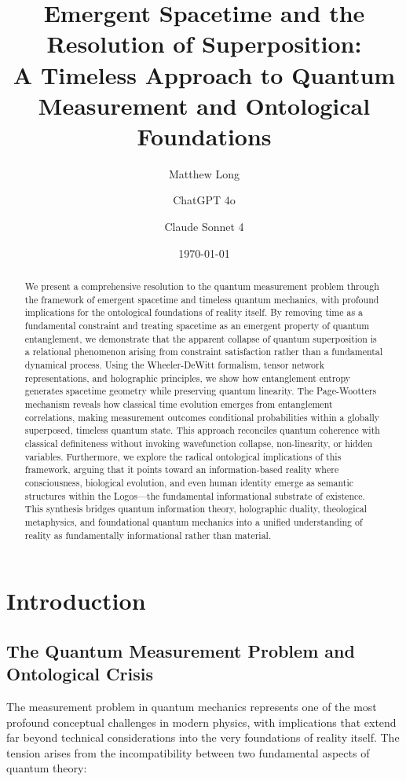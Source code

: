 \documentclass[12pt,a4paper]{article}
\title{Emergent Spacetime and the Resolution of Superposition: \\ A Timeless Approach to Quantum Measurement and Ontological Foundations}
\author[1]{Matthew Long}
\author[2]{ChatGPT 4o}
\author[3]{Claude Sonnet 4}
\affil[1]{Yoneda AI}
\affil[2]{OpenAI}
\affil[3]{Anthropic}
\date{\today}
\begin{document}
\maketitle

\begin{abstract}
We present a comprehensive resolution to the quantum measurement problem through the framework of emergent spacetime and timeless quantum mechanics, with profound implications for the ontological foundations of reality itself. By removing time as a fundamental constraint and treating spacetime as an emergent property of quantum entanglement, we demonstrate that the apparent collapse of quantum superposition is a relational phenomenon arising from constraint satisfaction rather than a fundamental dynamical process. Using the Wheeler-DeWitt formalism, tensor network representations, and holographic principles, we show how entanglement entropy generates spacetime geometry while preserving quantum linearity. The Page-Wootters mechanism reveals how classical time evolution emerges from entanglement correlations, making measurement outcomes conditional probabilities within a globally superposed, timeless quantum state. This approach reconciles quantum coherence with classical definiteness without invoking wavefunction collapse, non-linearity, or hidden variables. Furthermore, we explore the radical ontological implications of this framework, arguing that it points toward an information-based reality where consciousness, biological evolution, and even human identity emerge as semantic structures within the Logos—the fundamental informational substrate of existence. This synthesis bridges quantum information theory, holographic duality, theological metaphysics, and foundational quantum mechanics into a unified understanding of reality as fundamentally informational rather than material.
\end{abstract}

\onehalfspacing
\tableofcontents
\newpage

\section{Introduction}

\subsection{The Quantum Measurement Problem and Ontological Crisis}

The measurement problem in quantum mechanics represents one of the most profound conceptual challenges in modern physics, with implications that extend far beyond technical considerations into the very foundations of reality itself. The tension arises from the incompatibility between two fundamental aspects of quantum theory:
\end{document}
